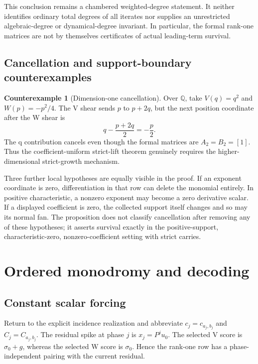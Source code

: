 \documentclass[11pt,letterpaper]{article}
\theoremstyle{definition}
\newtheorem{counterexample}[theorem]{Counterexample}
\theoremstyle{remark}
\numberwithin{equation}{section}
\begin{document}
This conclusion remains a chambered weighted-degree statement.  It neither
identifies ordinary total degrees of all iterates nor supplies an unrestricted
algebraic-degree or dynamical-degree invariant.  In particular, the formal
rank-one matrices are not by themselves certificates of actual leading-term
survival.

\subsection{Cancellation and support-boundary counterexamples}

\begin{counterexample}[Dimension-one cancellation]
\label{cex:dimension-one}
Over \(\mathbb Q\), take \(V(q)=q^2\) and \(W(p)=-p^2/4\).  The V shear
sends \(p\) to \(p+2q\), but the next position coordinate after the W shear
is
\begin{equation}
 q-\frac{p+2q}{2}=-\frac p2.
 \label{eq:dimension-one-cancellation}
\end{equation}
The q contribution cancels even though the formal matrices are
\(A_2=B_2=[1]\).  Thus the coefficient-uniform strict-lift theorem genuinely
requires the higher-dimensional strict-growth mechanism.
\end{counterexample}

Three further local hypotheses are equally visible in the proof.  If an
exponent coordinate is zero, differentiation in that row can delete the
monomial entirely.  In positive characteristic, a nonzero exponent may
become a zero derivative scalar.  If a displayed coefficient is zero, the
collected support itself changes and so may its normal fan.  The proposition
does not classify cancellation after removing any of these hypotheses; it
asserts survival exactly in the positive-support, characteristic-zero,
nonzero-coefficient setting with strict carries.

\section{Ordered monodromy and decoding}

\subsection{Constant scalar forcing}

Return to the explicit incidence realization and abbreviate
\(c_j=c_{a_j,b_j}\) and \(C_j=C_{a_j,b_j}\).  The residual spike at phase
\(j\) is \(x_j=P^ju_0\).  The selected V score is \(\sigma_0+g\), whereas the
selected W score is \(\sigma_0\).  Hence the rank-one row has a phase-independent
pairing with the current residual.
\end{document}
